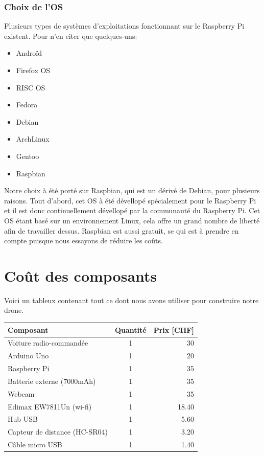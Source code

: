 \documentclass[a4paper,12pt]{report}
\begin{document}
{\subsubsection{Choix de l'OS}
Plusieurs types de systèmes d'exploitations fonctionnant sur le Raspberry Pi existent. Pour n'en citer que quelques-uns:
\begin{multicols}{2}
\begin{itemize}
\item Androïd
\item Firefox OS
\item RISC OS
\item Fedora
\item Debian
\item ArchLinux
\item Gentoo
\item Raspbian
\end{itemize}
\end{multicols}
Notre choix à été porté sur Raspbian, qui est un dérivé de Debian, pour plusieurs raisons. Tout d'abord, cet OS à été dévellopé spécialement pour le Raspberry Pi et il est donc continuellement dévellopé par la communauté du Raspberry Pi. Cet OS étant basé sur un environnement Linux, cela offre un grand nombre de liberté afin de travailler dessus. Raspbian est aussi gratuit, se qui est à prendre en compte puisque nous essayons de réduire les coûts.  



\section{Coût des composants}
Voici un tableux contenant tout ce dont nous avons utiliser pour construire notre drone.
\begin{table}
\begin{tabular}{| l | c | r |}
\hline
Composant & Quantité & Prix [CHF] \\
\hline
Voiture radio-commandée & 1 & 30\\
\hline
Arduino Uno & 1 & 20 \\
\hline
Raspberry Pi& 1 & 35 \\
\hline
Batterie externe (7000mAh) &1 & 35 \\
\hline
Webcam & 1 & 35\\
\hline
Edimax EW7811Un (wi-fi) & 1 & 18.40\\
\hline
Hub USB & 1 & 5.60\\
\hline
Capteur de distance (HC-SR04) & 1 & 3.20\\
\hline
Câble micro USB & 1 & 1.40\\
\hline



\end{tabular}
\end{table}}
\end{document}
